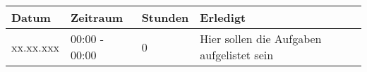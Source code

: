 \begin{tabular}{|l|l|l|l|}
\hline
Datum & Zeitraum & Stunden & Erledigt \\
\hline
    xx.xx.xxx & 00:00 - 00:00 & 0 & Hier sollen die Aufgaben aufgelistet sein\\
\hline
\end{tabular}